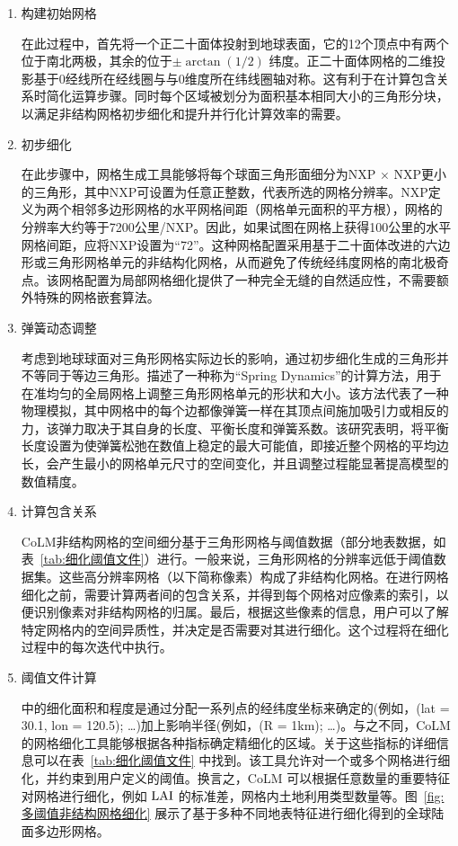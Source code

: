 \begin{enumerate}
  \item 构建初始网格

    在此过程中，首先将一个正二十面体投射到地球表面，它的12个顶点中有两个位于南北两极，其余的位于$\pm\arctan(1/2)$ 纬度。正二十面体网格的二维投影基于0\textdegree 经线所在经线圈与与0\textdegree 维度所在纬线圈轴对称。这有利于在计算包含关系时简化运算步骤。同时每个区域被划分为面积基本相同大小的三角形分块，以满足非结构网格初步细化和提升并行化计算效率的需要。

  \item 初步细化

    在此步骤中，网格生成工具能够将每个球面三角形面细分为NXP $\times$ NXP更小的三角形，其中NXP可设置为任意正整数，代表所选的网格分辨率。NXP定义为两个相邻多边形网格的水平网格间距（网格单元面积的平方根），网格的分辨率大约等于7200公里/NXP。因此，如果试图在网格上获得100公里的水平网格间距，应将NXP设置为“72”。这种网格配置采用基于二十面体改进的六边形或三角形网格单元的非结构化网格，从而避免了传统经纬度网格的南北极奇点。该网格配置为局部网格细化提供了一种完全无缝的自然适应性，不需要额外特殊的网格嵌套算法。

  \item 弹簧动态调整

    考虑到地球球面对三角形网格实际边长的影响，通过初步细化生成的三角形并不等同于等边三角形。\citet{tomita2002optimization}描述了一种称为“Spring Dynamics”的计算方法，用于在准均匀的全局网格上调整三角形网格单元的形状和大小。该方法代表了一种物理模拟，其中网格中的每个边都像弹簧一样在其顶点间施加吸引力或相反的力，该弹力取决于其自身的长度、平衡长度和弹簧系数。该研究表明，将平衡长度设置为使弹簧松弛在数值上稳定的最大可能值，即接近整个网格的平均边长，会产生最小的网格单元尺寸的空间变化，并且调整过程能显著提高模型的数值精度。

  \item 计算包含关系

    CoLM非结构网格的空间细分基于三角形网格与阈值数据（部分地表数据，如表~\ref{tab:细化阈值文件}）进行。一般来说，三角形网格的分辨率远低于阈值数据集。这些高分辨率网格（以下简称像素）构成了非结构化网格。在进行网格细化之前，需要计算两者间的包含关系，并得到每个网格对应像素的索引，以便识别像素对非结构网格的归属。最后，根据这些像素的信息，用户可以了解特定网格内的空间异质性，并决定是否需要对其进行细化。这个过程将在细化过程中的每次迭代中执行。

  \item 阈值文件计算


    \citet{walko_direct_2011} 中的细化面积和程度是通过分配一系列点的经纬度坐标来确定的(例如，(lat = 30.1, lon = 120.5); \dots)加上影响半径(例如，(R = 1km); \dots)。与之不同，CoLM的网格细化工具能够根据各种指标确定精细化的区域。关于这些指标的详细信息可以在表~\ref{tab:细化阈值文件} 中找到。该工具允许对一个或多个网格进行细化，并约束到用户定义的阈值。换言之，CoLM 可以根据任意数量的重要特征对网格进行细化，例如 ${\rm LAI}$ 的标准差，网格内土地利用类型数量等。图~\ref{fig:多阈值非结构网格细化} 展示了基于多种不同地表特征进行细化得到的全球陆面多边形网格。


\end{enumerate}
